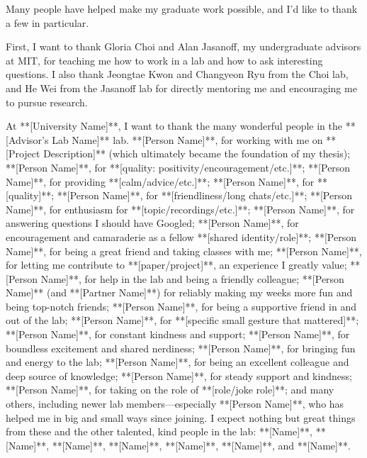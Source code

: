 

Many people have helped make my graduate work possible, and I’d like to thank a few in particular.

First, I want to thank Gloria Choi and Alan Jasanoff, my undergraduate advisors at MIT, for teaching me how to work in a lab and how to ask interesting questions. I also thank Jeongtae Kwon and Changyeon Ryu from the Choi lab, and He Wei from the Jasanoff lab for directly mentoring me and encouraging me to pursue research.


At **[University Name]**, I want to thank the many wonderful people in the **[Advisor’s Lab Name]** lab. **[Person Name]**, for working with me on **[Project Description]** (which ultimately became the foundation of my thesis); **[Person Name]**, for **[quality: positivity/encouragement/etc.]**; **[Person Name]**, for providing **[calm/advice/etc.]**; **[Person Name]**, for **[quality]**; **[Person Name]**, for **[friendliness/long chats/etc.]**; **[Person Name]**, for enthusiasm for **[topic/recordings/etc.]**; **[Person Name]**, for answering questions I should have Googled; **[Person Name]**, for encouragement and camaraderie as a fellow **[shared identity/role]**; **[Person Name]**, for being a great friend and taking classes with me; **[Person Name]**, for letting me contribute to **[paper/project]**, an experience I greatly value; **[Person Name]**, for help in the lab and being a friendly colleague; **[Person Name]** (and **[Partner Name]**) for reliably making my weeks more fun and being top-notch friends; **[Person Name]**, for being a supportive friend in and out of the lab; **[Person Name]**, for **[specific small gesture that mattered]**; **[Person Name]**, for constant kindness and support; **[Person Name]**, for boundless excitement and shared nerdiness; **[Person Name]**, for bringing fun and energy to the lab; **[Person Name]**, for being an excellent colleague and deep source of knowledge; **[Person Name]**, for steady support and kindness; **[Person Name]**, for taking on the role of **[role/joke role]**; and many others, including newer lab members—especially **[Person Name]**, who has helped me in big and small ways since joining. I expect nothing but great things from these and the other talented, kind people in the lab: **[Name]**, **[Name]**, **[Name]**, **[Name]**, **[Name]**, **[Name]**, and **[Name]**.

